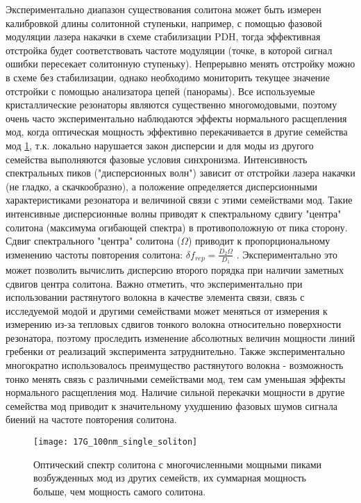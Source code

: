 Экспериментально диапазон существования солитона может быть измерен калибровкой длины солитонной ступеньки, например, с помощью фазовой модуляции лазера накачки в схеме стабилизации PDH, тогда эффективная отстройка будет соответствовать частоте модуляции (точке, в которой сигнал ошибки пересекает солитонную ступеньку). Непрерывно менять отстройку можно в схеме без стабилизации, однако необходимо мониторить текущее значение отстройки с помощью анализатора цепей (панорамы). Все используемые кристаллические резонаторы являются существенно многомодовыми, поэтому очень часто экспериментально наблюдаются эффекты нормального расщепления мод, когда оптическая мощность эффективно перекачивается в другие семейства мод \ref{17G_100nm_single_soliton_amx}, т.к. локально нарушается закон дисперсии и для моды из другого семейства выполняются фазовые условия синхронизма. Интенсивность спектральных пиков ("дисперсионных волн") зависит от отстройки лазера накачки (не гладко, а скачкообразно), а положение определяется дисперсионными характеристиками резонатора и величиной связи с этими семействами мод. Такие интенсивные дисперсионные волны приводят к спектральному сдвигу "центра" солитона (максимума огибающей спектра) в противоположную от пика сторону. Сдвиг спектрального "центра" солитона ($\Omega$) приводит к пропорциональному изменению частоты повторения солитона: $\delta f_{rep}=\frac{D_2\Omega}{D_1}$ \cite{Yang:16}. Экспериментально это может позволить вычислить дисперсию второго порядка при наличии заметных сдвигов центра солитона. Важно отметить, что экспериментально при использовании растянутого волокна в качестве элемента связи, связь с исследуемой модой и другими семействами может меняться от измерения к измерению из-за тепловых сдвигов тонкого волокна относительно поверхности резонатора, поэтому проследить изменение абсолютных величин мощности линий гребенки от реализаций эксперимента затруднительно. Также экспериментально многократно использовалось преимущество растянутого волокна - возможность тонко менять связь с различными семействами мод, тем сам уменьшая эффекты нормального расщепления мод. Наличие сильной перекачки мощности в другие семейства мод приводит к значительному ухудшению фазовых шумов сигнала биений на частоте повторения солитона.

\begin{figure}[ht]
\centering
  \texttt{[image: 17G\_100nm\_single\_soliton]}
  \caption{Оптический спектр солитона с многочисленными мощными пиками возбужденных мод из других семейств, их суммарная мощность больше, чем мощность самого солитона.}
  \label{17G_100nm_single_soliton_amx}
\end{figure}

